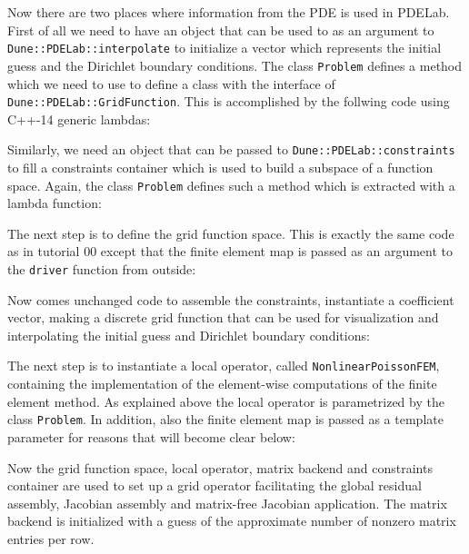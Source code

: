 \documentclass[a4paper,12pt]{article}
\begin{document}
Now there are two places where information from the PDE is used
in PDELab. First of all we need to have an object that can be used to
as an argument to \lstinline{Dune::PDELab::interpolate} to
initialize a vector which represents the initial guess and the Dirichlet boundary conditions.
The class \lstinline{Problem} defines a method which we need to use
to define a class with the interface of \lstinline{Dune::PDELab::GridFunction}.
This is accomplished by the follwing code using C++-14 generic lambdas:


Similarly, we need an object that can be passed to
\lstinline{Dune::PDELab::constraints} to fill a constraints container which
is used to build a subspace of a function space. Again, the
class \lstinline{Problem} defines such a method which is extracted with
a lambda function:


The next step is to define the grid function space. This is
exactly the same code as in tutorial 00 except that the finite element
map is passed as an argument to the \lstinline{driver} function from outside:


Now comes unchanged code to assemble the constraints,
instantiate a coefficient vector, making a discrete grid function that can be
used for visualization and interpolating the initial guess and Dirichlet boundary
conditions:


The next step is to instantiate a local operator, called \lstinline{NonlinearPoissonFEM},
containing the implementation of the element-wise computations of the finite element
method. As explained above the local operator is parametrized by the class
\lstinline{Problem}. In addition, also the finite element map is passed as a template
parameter for reasons that will become clear below:


Now the grid function space, local operator, matrix backend and
constraints container are used to set up a grid operator facilitating
the global residual assembly, Jacobian assembly and matrix-free Jacobian application.
The matrix backend is initialized with a guess of the approximate number
of nonzero matrix entries per row.

\end{document}
